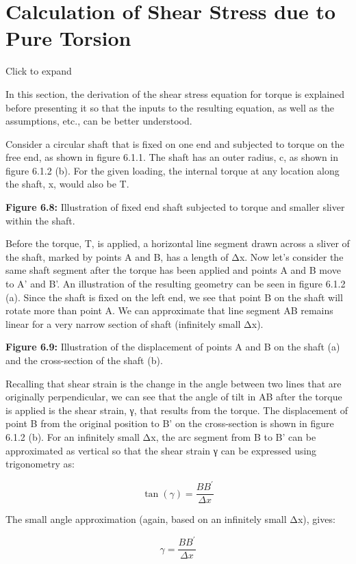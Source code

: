 \documentclass[
  letterpaper,
  DIV=11,
  numbers=noendperiod]{scrreprt}
\theoremstyle{definition}
\theoremstyle{remark}
\begin{document}
\section{Calculation of Shear Stress due to Pure Torsion}\label{sec-6.1}

Click to expand

In this section, the derivation of the shear stress equation for torque
is explained before presenting it so that the inputs to the resulting
equation, as well as the assumptions, etc., can be better understood.

Consider a circular shaft that is fixed on one end and subjected to
torque on the free end, as shown in figure 6.1.1. The shaft has an outer
radius, c, as shown in figure 6.1.2 (b). For the given loading, the
internal torque at any location along the shaft, x, would also be T.

\textbf{Figure 6.8:} Illustration of fixed end shaft subjected to torque
and smaller sliver within the shaft.

Before the torque, T, is applied, a horizontal line segment drawn across
a sliver of the shaft, marked by points A and B, has a length of Δx. Now
let's consider the same shaft segment after the torque has been applied
and points A and B move to A' and B'. An illustration of the resulting
geometry can be seen in figure 6.1.2 (a). Since the shaft is fixed on
the left end, we see that point B on the shaft will rotate more than
point A. We can approximate that line segment AB remains linear for a
very narrow section of shaft (infinitely small Δx).

\textbf{Figure 6.9:} Illustration of the displacement of points A and B
on the shaft (a) and the cross-section of the shaft (b).

Recalling that shear strain is the change in the angle between two lines
that are originally perpendicular, we can see that the angle of tilt in
AB after the torque is applied is the shear strain, γ, that results from
the torque. The displacement of point B from the original position to B'
on the cross-section is shown in figure 6.1.2 (b). For an infinitely
small Δx, the arc segment from B to B' can be approximated as vertical
so that the shear strain γ can be expressed using trigonometry as:

\[
\tan (\gamma)=\frac{B B^{\prime}}{\Delta x}
\]

The small angle approximation (again, based on an infinitely small Δx),
gives:

\[
\gamma=\frac{B B^{\prime}}{\Delta x}
\]
\end{document}
